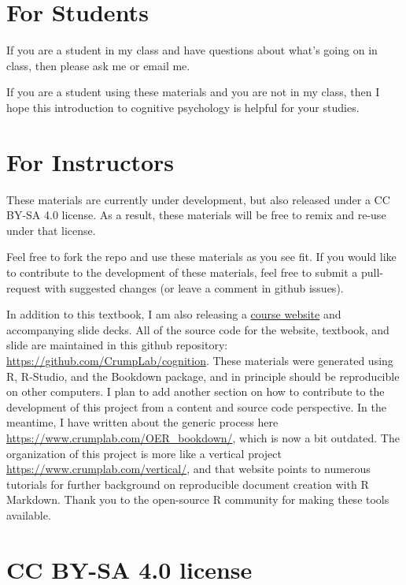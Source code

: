 \documentclass[
  oneside,
  12pt]{crumpbook}
\begin{document}
\hypertarget{for-students}{%
\section{For Students}\label{for-students}}

If you are a student in my class and have questions about what's going on in class, then please ask me or email me.

If you are a student using these materials and you are not in my class, then I hope this introduction to cognitive psychology is helpful for your studies.

\hypertarget{for-instructors}{%
\section{For Instructors}\label{for-instructors}}

These materials are currently under development, but also released under a CC BY-SA 4.0 license. As a result, these materials will be free to remix and re-use under that license.

Feel free to fork the repo and use these materials as you see fit. If you would like to contribute to the development of these materials, feel free to submit a pull-request with suggested changes (or leave a comment in github issues).

In addition to this textbook, I am also releasing a \href{https://www.crumplab.com/cognition/}{course website} and accompanying slide decks. All of the source code for the website, textbook, and slide are maintained in this github repository: \url{https://github.com/CrumpLab/cognition}. These materials were generated using R, R-Studio, and the Bookdown package, and in principle should be reproducible on other computers. I plan to add another section on how to contribute to the development of this project from a content and source code perspective. In the meantime, I have written about the generic process here \url{https://www.crumplab.com/OER_bookdown/}, which is now a bit outdated. The organization of this project is more like a vertical project \url{https://www.crumplab.com/vertical/}, and that website points to numerous tutorials for further background on reproducible document creation with R Markdown. Thank you to the open-source R community for making these tools available.

\hypertarget{cc-by-sa-4.0-license}{%
\section{CC BY-SA 4.0 license}\label{cc-by-sa-4.0-license}}
\end{document}
